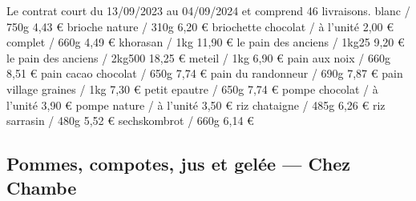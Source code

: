 \documentclass[8pt,a4paper,french]{article}
\makeatletter
\newcommand{\authoredby}[1]{\addtocontents{toc}{\protect\@nameuse{authoredby#1}}}%
\makeatother
\begin{document}
\noindent Le contrat court du 13/09/2023 au 04/09/2024 et comprend 46 livraisons.\newline\newline
{\color{Blue} blanc / 750g 4,43 € }\newline
{\color{Blue} brioche nature / 310g 6,20 € }\newline
{\color{Blue} briochette chocolat / à l'unité 2,00 € }\newline
{\color{Blue} complet / 660g 4,49 € }\newline
{\color{Blue} khorasan / 1kg 11,90 € }\newline
{\color{Blue} le pain des anciens / 1kg25 9,20 € }\newline
{\color{Blue} le pain des anciens / 2kg500 18,25 €}\newline
{\color{Blue} meteil / 1kg 6,90 € }\newline
{\color{Blue} pain aux noix / 660g 8,51 €}\newline
{\color{Blue} pain cacao chocolat / 650g 7,74 €}\newline
{\color{Blue} pain du randonneur / 690g 7,87 €}\newline
{\color{Blue} pain village graines / 1kg 7,30 € }\newline
{\color{Blue} petit epautre / 650g 7,74 €}\newline
{\color{Blue} pompe chocolat / à l'unité 3,90 € }\newline
{\color{Blue} pompe nature / à l'unité 3,50 €}\newline
{\color{Blue} riz chataigne / 485g 6,26 € }\newline
{\color{Blue} riz sarrasin / 480g 5,52 € }\newline
{\color{Blue} sechskombrot / 660g 6,14 €}

\authoredby{B}
\subsection{Pommes, compotes, jus et gelée --- Chez Chambe}
\end{document}
